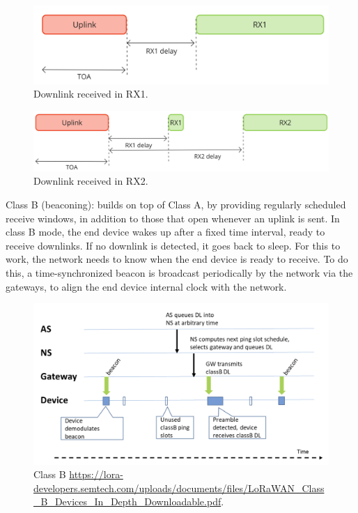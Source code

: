 \begin{figure}[H]
    \centering
    \includegraphics[width=0.7\linewidth]{figures/ClassA_2.jpg}
    \caption{Downlink received in RX1.}
    \label{fig:ClassA-RX1}
\end{figure}

\begin{figure}[H]
    \centering
    \includegraphics[width=0.7\linewidth]{figures/ClassA_3.jpg}
    \caption{Downlink received in RX2.}
    \label{fig:ClassA-RX2}
\end{figure}

Class B (beaconing): builds on top of Class A, by providing regularly scheduled receive windows, in addition to those that open whenever an uplink is sent.
In class B mode, the end device wakes up after a fixed time interval, ready to receive downlinks. If no downlink is detected, it goes back to sleep. For this to work, the network needs to know when the end device is ready to receive. To do this, a time-synchronized beacon is broadcast periodically by the network via the gateways, to align the end device internal clock with the network.

\begin{figure}[H]
    \centering
    \includegraphics[width=0.7\linewidth]{figures/class_B.png}
    \caption{Class B \url{https://lora-developers.semtech.com/uploads/documents/files/LoRaWAN_Class_B_Devices_In_Depth_Downloadable.pdf}.}
    \label{fig:Class_B}
\end{figure}

